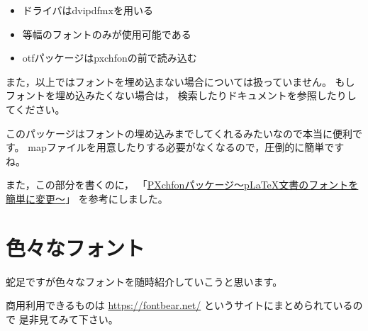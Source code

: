 \begin{itemize}
\item ドライバはdvipdfmxを用いる
\item 等幅のフォントのみが使用可能である
\item otfパッケージはpxchfonの前で読み込む
\end{itemize}

また，以上ではフォントを埋め込まない場合については扱っていません。
もしフォントを埋め込みたくない場合は，
検索したりドキュメントを参照したりしてください。

このパッケージはフォントの埋め込みまでしてくれるみたいなので本当に便利です。
mapファイルを用意したりする必要がなくなるので，圧倒的に簡単ですね。

また，この部分を書くのに，
「\href{http://zrbabbler.sp.land.to/pxchfon.html}{PXchfonパッケージ～pLaTeX文書のフォントを簡単に変更～}」
を参考にしました。



\section{色々なフォント}
蛇足ですが色々なフォントを随時紹介していこうと思います。

商用利用できるものは
\href{https://fontbear.net/}{https://fontbear.net/}
というサイトにまとめられているので
是非見てみて下さい。

